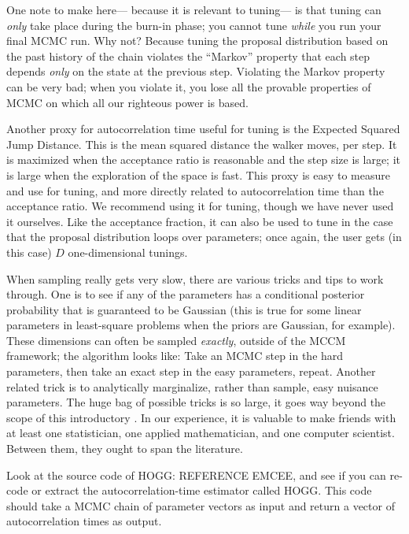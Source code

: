 \documentclass[12pt,twoside,pdftex]{article}
\begin{document}
One note to make here---%
  because it is relevant to tuning---%
  is that tuning can \emph{only} take place during the burn-in phase;
  you cannot tune \emph{while} you run your final MCMC run.
Why not?
Because tuning the proposal distribution based on the past history of the chain
  violates the ``Markov'' property
  that each step depends \emph{only} on the state at the previous step.
Violating the Markov property can be very bad;
  when you violate it,
  you lose all the provable properties of MCMC
  on which all our righteous power is based.

Another proxy for autocorrelation time useful for tuning is the
  Expected Squared Jump Distance.
This is the mean squared distance the walker moves, per step.
It is maximized when the acceptance ratio is reasonable
  and the step size is large;
  it is large when the exploration of the space is fast.
This proxy is easy to measure and use for tuning,
  and more directly related to autocorrelation time than the acceptance ratio.
We recommend using it for tuning, though we have never used it ourselves.
Like the acceptance fraction, it can also be used to tune
  in the case that the proposal distribution loops over parameters;
  once again, the user gets (in this case) $D$ one-dimensional tunings.

When sampling really gets very slow,
  there are various tricks and tips to work through.
One is to see if any of the parameters has a conditional posterior
  probability that is guaranteed to be Gaussian
  (this is true for some linear parameters in least-square problems
  when the priors are Gaussian, for example).
These dimensions can often be sampled \emph{exactly},
  outside of the MCCM framework;
  the algorithm looks like:
Take an MCMC step in the hard parameters,
  then take an exact step in the easy parameters,
  repeat.
Another related trick is to analytically marginalize,
  rather than sample,
  easy nuisance parameters.
The huge bag of possible tricks is so large,
  it goes way beyond the scope of this introductory \documentname.
In our experience, it is valuable to make friends with at least one statistician,
  one applied mathematician, and one computer scientist.
Between them, they ought to span the literature.

\begin{problem}
Look at the source code of HOGG: REFERENCE EMCEE, and see if you can
re-code or extract the autocorrelation-time estimator called HOGG.
This code should take a MCMC chain of parameter vectors as input and
return a vector of autocorrelation times as output.
\end{problem}
\end{document}

